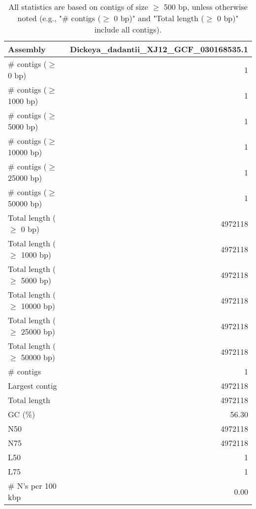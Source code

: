 \documentclass[12pt,a4paper]{article}
\begin{document}
\begin{table}[ht]
\begin{center}
\caption{All statistics are based on contigs of size $\geq$ 500 bp, unless otherwise noted (e.g., "\# contigs ($\geq$ 0 bp)" and "Total length ($\geq$ 0 bp)" include all contigs).}
\begin{tabular}{|l*{1}{|r}|}
\hline
Assembly & Dickeya\_dadantii\_XJ12\_GCF\_030168535.1 \\ \hline
\# contigs ($\geq$ 0 bp) & 1 \\ \hline
\# contigs ($\geq$ 1000 bp) & 1 \\ \hline
\# contigs ($\geq$ 5000 bp) & 1 \\ \hline
\# contigs ($\geq$ 10000 bp) & 1 \\ \hline
\# contigs ($\geq$ 25000 bp) & 1 \\ \hline
\# contigs ($\geq$ 50000 bp) & 1 \\ \hline
Total length ($\geq$ 0 bp) & 4972118 \\ \hline
Total length ($\geq$ 1000 bp) & 4972118 \\ \hline
Total length ($\geq$ 5000 bp) & 4972118 \\ \hline
Total length ($\geq$ 10000 bp) & 4972118 \\ \hline
Total length ($\geq$ 25000 bp) & 4972118 \\ \hline
Total length ($\geq$ 50000 bp) & 4972118 \\ \hline
\# contigs & 1 \\ \hline
Largest contig & 4972118 \\ \hline
Total length & 4972118 \\ \hline
GC (\%) & 56.30 \\ \hline
N50 & 4972118 \\ \hline
N75 & 4972118 \\ \hline
L50 & 1 \\ \hline
L75 & 1 \\ \hline
\# N's per 100 kbp & 0.00 \\ \hline
\end{tabular}
\end{center}
\end{table}
\end{document}
